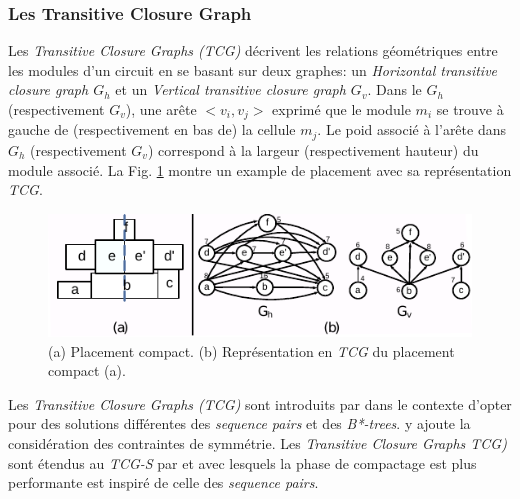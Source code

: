 \subsubsection{Les Transitive Closure Graph}
Les {\it Transitive Closure Graphs (TCG)} décrivent les relations géométriques entre les modules d'un circuit en se basant sur deux graphes: un {\it Horizontal transitive closure graph $G_h$} et un {\it Vertical transitive closure graph $G_v$}. Dans le {\it $G_h$} (respectivement {\it $G_v$}), une arête $<v_i,v_j>$ exprimé que le module $m_i$ se trouve à gauche de (respectivement en bas de) la cellule $m_j$. Le poid associé à l'arête dans {\it $G_h$} (respectivement {\it $G_v$}) correspond à la largeur (respectivement hauteur) du module associé. La Fig. \ref{fig:6} montre un example de placement avec sa représentation {\it TCG}. \newline

\begin{figure}[h]
\begin{center}
  \includegraphics[height=0.17\textheight]{Figures/6.pdf}
  \caption{(a) Placement compact. (b) Représentation en {\it TCG} du placement compact (a).}
\label{fig:6}
\end{center}
\end{figure}

Les {\it Transitive Closure Graphs (TCG)} sont introduits par \cite{Lin2001} dans le contexte d'opter pour des solutions différentes des {\it sequence pairs} et des {\it B*-trees}. \cite{Zhang2008} y ajoute la considération des contraintes de symmétrie. Les {\it Transitive Closure Graphs TCG)} sont étendus au {\it TCG-S} par \cite{Lin2004a} et \cite{Ming2005} avec lesquels la phase de compactage est plus performante est inspiré de celle des {\it sequence pairs}.

